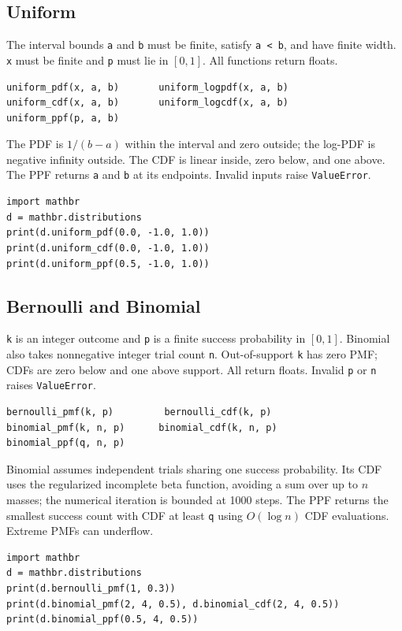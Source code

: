 \documentclass[11pt,a4paper]{article}
\begin{document}
\subsection{Uniform}
The interval bounds \verb|a| and \verb|b| must be finite, satisfy \verb|a < b|, and have finite width. \verb|x| must be finite and \verb|p| must lie in $[0,1]$. All functions return floats.
\begin{verbatim}
uniform_pdf(x, a, b)       uniform_logpdf(x, a, b)
uniform_cdf(x, a, b)       uniform_logcdf(x, a, b)
uniform_ppf(p, a, b)
\end{verbatim}
The PDF is $1/(b-a)$ within the interval and zero outside; the log-PDF is negative infinity outside. The CDF is linear inside, zero below, and one above. The PPF returns \verb|a| and \verb|b| at its endpoints. Invalid inputs raise \verb|ValueError|.
\begin{verbatim}
import mathbr
d = mathbr.distributions
print(d.uniform_pdf(0.0, -1.0, 1.0))
print(d.uniform_cdf(0.0, -1.0, 1.0))
print(d.uniform_ppf(0.5, -1.0, 1.0))
\end{verbatim}

\subsection{Bernoulli and Binomial}
\verb|k| is an integer outcome and \verb|p| is a finite success probability in $[0,1]$. Binomial also takes nonnegative integer trial count \verb|n|. Out-of-support \verb|k| has zero PMF; CDFs are zero below and one above support. All return floats. Invalid \verb|p| or \verb|n| raises \verb|ValueError|.
\begin{verbatim}
bernoulli_pmf(k, p)         bernoulli_cdf(k, p)
binomial_pmf(k, n, p)      binomial_cdf(k, n, p)
binomial_ppf(q, n, p)
\end{verbatim}
Binomial assumes independent trials sharing one success probability. Its CDF uses the regularized incomplete beta function, avoiding a sum over up to $n$ masses; the numerical iteration is bounded at 1000 steps. The PPF returns the smallest success count with CDF at least \verb|q| using $O(\log n)$ CDF evaluations. Extreme PMFs can underflow.
\begin{verbatim}
import mathbr
d = mathbr.distributions
print(d.bernoulli_pmf(1, 0.3))
print(d.binomial_pmf(2, 4, 0.5), d.binomial_cdf(2, 4, 0.5))
print(d.binomial_ppf(0.5, 4, 0.5))
\end{verbatim}
\end{document}
